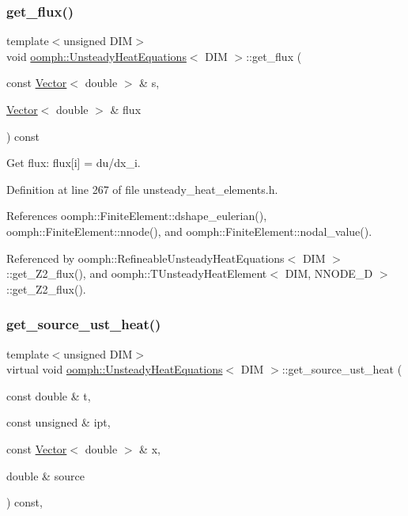 \subsubsection{\texorpdfstring{get\+\_\+flux()}{get\_flux()}}
{\footnotesize\ttfamily template$<$unsigned D\+IM$>$ \\
void \hyperlink{classoomph_1_1UnsteadyHeatEquations}{oomph\+::\+Unsteady\+Heat\+Equations}$<$ D\+IM $>$\+::get\+\_\+flux (\begin{DoxyParamCaption}\item[{const \hyperlink{classoomph_1_1Vector}{Vector}$<$ double $>$ \&}]{s,  }\item[{\hyperlink{classoomph_1_1Vector}{Vector}$<$ double $>$ \&}]{flux }\end{DoxyParamCaption}) const\hspace{0.3cm}{\ttfamily [inline]}}



Get flux\+: flux\mbox{[}i\mbox{]} = du/dx\+\_\+i. 



Definition at line 267 of file unsteady\+\_\+heat\+\_\+elements.\+h.



References oomph\+::\+Finite\+Element\+::dshape\+\_\+eulerian(), oomph\+::\+Finite\+Element\+::nnode(), and oomph\+::\+Finite\+Element\+::nodal\+\_\+value().



Referenced by oomph\+::\+Refineable\+Unsteady\+Heat\+Equations$<$ D\+I\+M $>$\+::get\+\_\+\+Z2\+\_\+flux(), and oomph\+::\+T\+Unsteady\+Heat\+Element$<$ D\+I\+M, N\+N\+O\+D\+E\+\_\+D $>$\+::get\+\_\+\+Z2\+\_\+flux().

\mbox{\label{classoomph_1_1UnsteadyHeatEquations_a8907d972136ac4e81f297b196968ebe8}} 
\subsubsection{\texorpdfstring{get\+\_\+source\+\_\+ust\+\_\+heat()}{get\_source\_ust\_heat()}}
{\footnotesize\ttfamily template$<$unsigned D\+IM$>$ \\
virtual void \hyperlink{classoomph_1_1UnsteadyHeatEquations}{oomph\+::\+Unsteady\+Heat\+Equations}$<$ D\+IM $>$\+::get\+\_\+source\+\_\+ust\+\_\+heat (\begin{DoxyParamCaption}\item[{const double \&}]{t,  }\item[{const unsigned \&}]{ipt,  }\item[{const \hyperlink{classoomph_1_1Vector}{Vector}$<$ double $>$ \&}]{x,  }\item[{double \&}]{source }\end{DoxyParamCaption}) const\hspace{0.3cm}{\ttfamily [inline]}, {\ttfamily [virtual]}}



